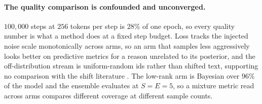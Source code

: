 \paragraph{The quality comparison is confounded and unconverged.}
$100{,}000$ steps at $256$ tokens per step is $28\%$ of one epoch, so every quality
number is what a method does at a fixed step budget. Loss tracks the injected noise
scale monotonically across arms, so an arm that samples less aggressively looks better
on predictive metrics for a reason unrelated to its posterior, and the
off-distribution stream is uniform-random ids rather than shifted text, supporting no
comparison with the shift literature \citep{ovadia2019trust}. The low-rank arm is
Bayesian over $96\%$ of the model and the ensemble evaluates at $S = E = 5$, so a
mixture metric read across arms compares different coverage at different sample
counts.
